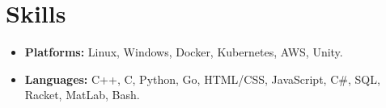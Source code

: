 \section*{Skills}
\begin{itemize}
    \item 
    \textbf{Platforms:} Linux, Windows, Docker, Kubernetes, AWS, Unity.
    \item 
    \textbf{Languages:} C++, C, Python, Go, HTML/CSS, JavaScript, C\#, SQL, Racket, MatLab, Bash.
\end{itemize}
